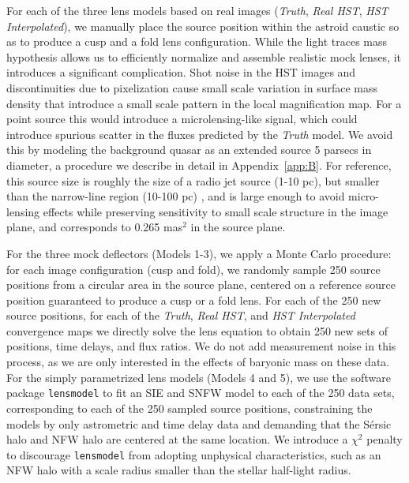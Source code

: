 For each of the three lens models based on real images (\textit{Truth}, \textit{Real HST}, \textit{HST Interpolated}), we manually place the source position within the astroid caustic so as to produce a cusp and a fold lens configuration. While the light traces mass hypothesis allows us to efficiently normalize and assemble realistic mock lenses, it introduces a significant complication. Shot noise in the HST images and discontinuities due to pixelization cause small scale variation in surface mass density that introduce a small scale pattern in the local magnification map. For a point source this would introduce a microlensing-like signal, which could introduce spurious scatter in the fluxes predicted by the \textit{Truth} model. We avoid this by modeling the background quasar as an extended source 5 parsecs in diameter, a procedure we describe in detail in Appendix~\ref{app:B}. For reference, this source size is roughly the size of a radio jet source (1-10 pc), but smaller than the narrow-line region (10-100 pc) \cite{MoustakasMetcalf02}, and is large enough to avoid micro-lensing effects while preserving sensitivity to small scale structure in the image plane, and corresponds to 0.265 mas$^2$ in the source plane.

For the three mock deflectors (Models 1-3), we apply a Monte Carlo procedure: for each image configuration (cusp and fold), we randomly sample 250 source positions from a circular area in the source plane, centered on a reference source position guaranteed to produce a cusp or a fold lens. For each of the 250 new source positions, for each of the \textit{Truth}, \textit{Real HST}, and \textit{HST Interpolated} convergence maps we directly solve the lens equation to obtain 250 new sets of positions, time delays, and flux ratios. We do not add measurement noise in this process, as we are only interested in the effects of baryonic mass on these data. 
\newline \indent For the simply parametrized lens models (Models 4 and 5), we use the software package {\tt{lensmodel}} to fit an SIE and SNFW model to each of the 250 data sets, corresponding to each of the 250 sampled source positions, constraining the models by only astrometric and time delay data and demanding that the S{\'e}rsic halo and NFW halo are centered at the same location. We introduce a $\chi^2$ penalty to discourage {\tt{lensmodel}} from adopting unphysical characteristics, such as an NFW halo with a scale radius smaller than the stellar half-light radius.


